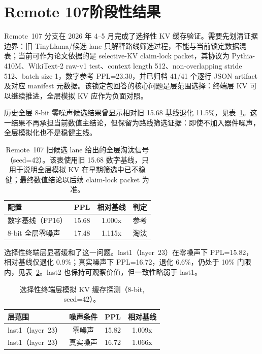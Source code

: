 \FloatBarrier

\section{Remote 107阶段性结果}
\label{sec:work2_results}

Remote~107 分支在 2026 年 4--5 月完成了选择性 KV 缓存验证。需要先划清证据边界：旧 TinyLlama/候选 lane 只解释路线筛选过程，不能与当前锁定数据混表；当前可作为论文依据的是 selective-KV claim-lock packet，其协议为 Pythia-410M、WikiText-2 raw-v1 test、context length 512、non-overlapping stride 512、batch size 1，数字参考 PPL=23.30，并已归档 41/41 个逐行 JSON artifact 及对应 manifest 元数据。该锁定包回答的核心问题是层范围选择：终端层 KV 可以继续推进，全层模拟 KV 应作为负面对照。

历史全层 8-bit 零噪声候选结果曾显示相对旧 15.68 基线退化 11.5\%，见表~\ref{tab:work2_baseline}。这一结果不再承担当前数值主结论，但保留为路线筛选证据：即使不加入器件噪声，全层模拟化也不是稳健主线。

\begin{table}[!htbp]
\centering
\caption{Remote~107 旧候选 lane 给出的全层淘汰信号（seed=42）。该表使用旧 15.68 数字基线，只用于说明全层模拟 KV 在早期筛选中已不稳健；最终数值结论以后续 claim-lock packet 为准。}
\label{tab:work2_baseline}
\begin{tabular}{@{}lccc@{}}
\toprule
配置 & PPL & 相对基线 & 判定 \\
\midrule
数字基线（FP16） & 15.68 & 1.000x & 参考 \\
8-bit 全层零噪声 & 17.48 & 1.115x & 淘汰 \\
\bottomrule
\end{tabular}
\end{table}

选择性终端层显著缓和了这一问题。last1（layer~23）在零噪声下 PPL=15.82，相对基线仅退化 0.9\%；真实噪声下 PPL=16.72，退化 6.6\%，仍处于 10\% 门限内，见表~\ref{tab:work2_selective}。last2 也保持可观察价值，但一致性略弱于 last1。

\begin{table}[!htbp]
\centering
\caption{选择性终端层模拟 KV 缓存探测（8-bit, seed=42）。}
\label{tab:work2_selective}
\begin{tabular}{@{}lccc@{}}
\toprule
层范围 & 噪声条件 & PPL & 相对基线 \\
\midrule
last1（layer~23） & 零噪声 & 15.82 & 1.009x \\
last1（layer~23） & 真实噪声 & 16.72 & 1.066x \\
\bottomrule
\end{tabular}
\end{table}

